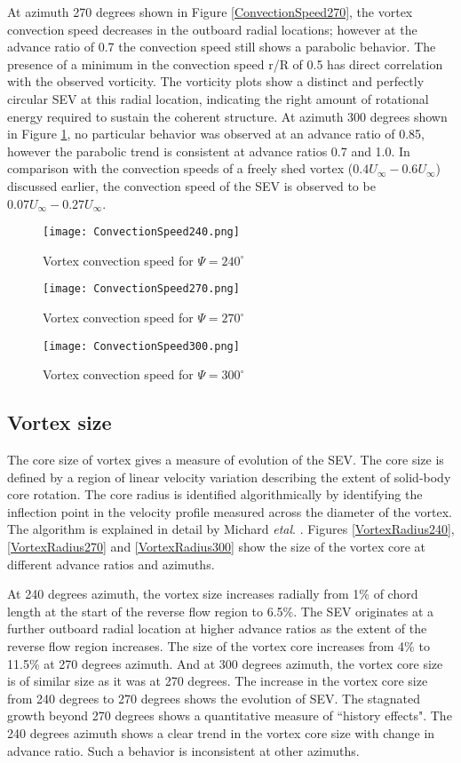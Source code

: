 \documentclass[%
 reprint,
 showkeys,
 amsmath,amssymb,
 aps,
]{revtex4-1}
\begin{document}
At azimuth 270 degrees shown in Figure \ref{ConvectionSpeed270}, the vortex convection speed decreases in the outboard radial locations; however at the advance ratio of 0.7 the convection speed still shows a parabolic behavior. The presence of a minimum in the convection speed r/R of 0.5 has direct correlation with the observed vorticity. The vorticity plots show a  distinct and perfectly circular SEV at this radial location, indicating the right amount of rotational energy required to sustain the coherent structure. At azimuth 300 degrees shown in Figure \ref{ConvectionSpeed300}, no particular behavior was observed at an advance ratio of 0.85, however the parabolic trend is consistent at advance ratios 0.7 and 1.0. In comparison with the convection speeds of a freely shed vortex ($0.4U_{\infty} - 0.6U_{\infty}$) discussed earlier, the convection speed of the SEV is observed to be $0.07U_{\infty} - 0.27U_{\infty}$.

\begin{figure}[!ht]
	\texttt{[image: ConvectionSpeed240.png]} 
	\caption{Vortex convection speed for $\Psi = 240^\circ$}
	\label{ConvectionSpeed240}
	
	\texttt{[image: ConvectionSpeed270.png]}
	\caption{Vortex convection speed for $\Psi = 270^\circ$}
	\label{ConvectionSpeed270}
	
	\texttt{[image: ConvectionSpeed300.png]}
	\caption{Vortex convection speed for $\Psi = 300^\circ$}
	\label{ConvectionSpeed300}
	
\end{figure}


\subsection{Vortex size}
The core size of vortex gives a measure of evolution of the SEV. The core size is defined by a region of linear velocity variation describing the extent of solid-body core rotation. The core radius is identified algorithmically by identifying the inflection point in the velocity profile measured across the diameter of the vortex. The algorithm is explained in detail by Michard \textit{etal}. \cite{graftieaux2001combining}. Figures \ref{VortexRadius240}, \ref{VortexRadius270} and \ref{VortexRadius300} show the size of the vortex core at different advance ratios and azimuths. 

At 240 degrees azimuth, the vortex size increases radially from 1\% of chord length at the start of the reverse flow region to 6.5\%. The SEV originates at a further outboard radial location at higher advance ratios as the extent of the reverse flow region increases. The size of the vortex core increases from 4\% to 11.5\% at 270 degrees azimuth. And at 300 degrees azimuth, the vortex core size is of similar size as it was at 270 degrees. The increase in the vortex core size from 240 degrees to 270 degrees shows the evolution of SEV. The stagnated growth beyond 270 degrees shows a quantitative measure of ``history effects". The 240 degrees azimuth shows a clear trend in the vortex core size with change in advance ratio. Such a behavior is inconsistent at other azimuths.
\end{document}
